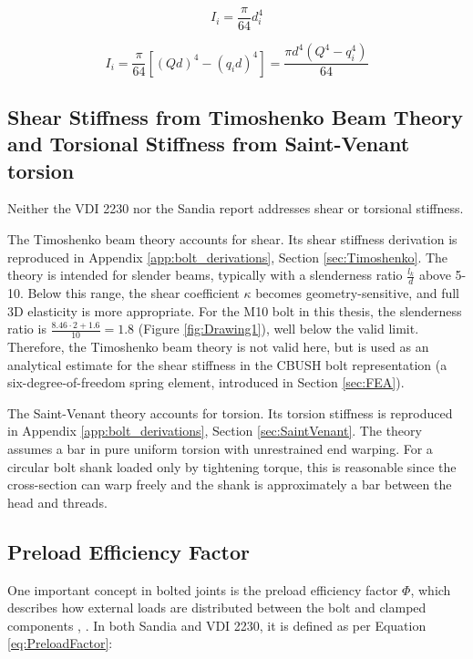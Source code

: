 \documentclass[a4paper,twoside]{bth}
\begin{document}
\begin{equation} \label{eq:I_VDI}
    I_i = \frac{\pi}{64} d_i^4
\end{equation}

\begin{equation} \label{eq:Sandia_moment_inertia}
    I_i = \frac{\pi}{64} \left[ (Qd)^4 - (q_id)^4 \right] = \frac{\pi d^4 (Q^4 - q_i^4)}{64}
\end{equation}

\subsection{Shear Stiffness from Timoshenko Beam Theory and Torsional Stiffness from Saint-Venant torsion}
Neither the VDI 2230 nor the Sandia report addresses shear or torsional stiffness.

The Timoshenko beam theory accounts for shear. Its shear stiffness derivation is reproduced in Appendix \ref{app:bolt_derivations}, Section \ref{sec:Timoshenko}. The theory is intended for slender beams, typically with a slenderness ratio $\tfrac{l_k}{d}$ above 5-10. Below this range, the shear coefficient $\kappa$ becomes geometry-sensitive, and full 3D elasticity is more appropriate. For the M10 bolt in this thesis, the slenderness ratio is $\tfrac{8.46\cdot 2 + 1.6}{10} = 1.8$ (Figure \ref{fig:Drawing1}), well below the valid limit. Therefore, the Timoshenko beam theory is not valid here, but is used as an analytical estimate for the shear stiffness in the CBUSH bolt representation (a six-degree-of-freedom spring element, introduced in Section \ref{sec:FEA}).

The Saint-Venant theory accounts for torsion. Its torsion stiffness is reproduced in Appendix \ref{app:bolt_derivations}, Section \ref{sec:SaintVenant}. The theory assumes a bar in pure uniform torsion with unrestrained end warping. For a circular bolt shank loaded only by tightening torque, this is reasonable since the cross-section can warp freely and the shank is approximately a bar between the head and threads. 

\subsection{Preload Efficiency Factor}
One important concept in bolted joints is the preload efficiency factor $\Phi$, which describes how external loads are distributed between the bolt and clamped components \cite{VDI}, \cite{Sandia}. In both Sandia and VDI 2230, it is defined as per Equation \ref{eq:PreloadFactor}:
\end{document}
